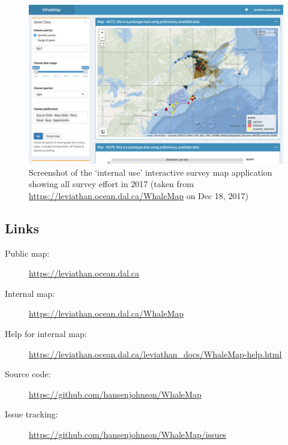 \documentclass[11pt, letterpaper]{article}
\begin{document}
\begin{figure}[H]
	\centering
	\includegraphics[width=0.7\linewidth]{WhaleMap_all}
	\caption{Screenshot of the `internal use' interactive survey map application showing all survey effort in 2017 (taken from \url{https://leviathan.ocean.dal.ca/WhaleMap} on Dec 18, 2017)}
	\label{fig:whalemapall}
\end{figure}

\subsection{Links}

\begin{description}
	\item[Public map:] \url{https://leviathan.ocean.dal.ca	}
	\item[Internal map:] \url{https://leviathan.ocean.dal.ca/WhaleMap}
	\item[Help for internal map:] \url{https://leviathan.ocean.dal.ca/leviathan_docs/WhaleMap-help.html}
	\item[Source code:] \url{https://github.com/hansenjohnson/WhaleMap}
	\item[Issue tracking:] \url{https://github.com/hansenjohnson/WhaleMap/issues}
\end{description}

\end{document}
